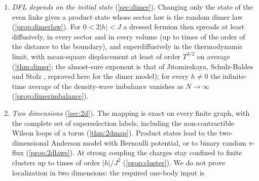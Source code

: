 \begin{enumerate}[label=(\arabic*),leftmargin=2em]
\begin{enumerate}[label=(\alph*)]
sectors equally; no operator-norm version exists, because the clean sector $q\equiv1$, i.e.\ the strictly
gauge-invariant subspace without background charges, is ballistic (\cref{prop:LR}, \cref{rem:gaussproj});
\item the infinite-time imbalance of an initial density wave is strictly positive (\cref{thm:imbalance});
\item the entanglement conditional on the charges, $\SG$, and, on average over the charges, the full
matter-plus-gauge entanglement of definite-charge initial states obey area laws (\cref{thm:arealaw}).  We determine the relations between the
entropies (\cref{prop:entropies}): the number entropy $\SN$ is a lower bound for $\Sfull$, $\Smix$ and the
bare-matter entropy, but not for $\SG$ (\cref{rem:main-SGSN});
\item the number entropy is bounded, with an explicit constant (\cref{thm:numberentropy});
\item thermodynamic limits exist on two-sided chains, with the corresponding bounds for bulk observables (the
imbalance excepted); this part uses only the Ge--Zhao bound on $\Z$ (\cref{thm:infvol}).
\end{enumerate}
The constants are explicit in terms of the decay profile of \cref{thm:EC}.
\item \emph{DFL depends on the initial state} (\cref{sec:dimer}).  Changing only the state of the even links gives a
product state whose sector law is the random dimer law (\cref{prop:dimerlaw}).  For $0<2|h|<J$ a dressed fermion
then spreads at least diffusively, in every sector and in every volume (up to times of the order of the distance to
the boundary), and superdiffusively in the thermodynamic limit, with mean-square displacement at least of order
$T^{3/2}$ on average (\cref{thm:dimer}; the almost-sure exponent is that of Jitomirskaya, Schulz-Baldes and Stolz
\cite{JSBS2003}, reproved here for the dimer model); for every $h\neq0$ the infinite-time average of the
density-wave imbalance vanishes as $N\to\infty$ (\cref{prop:dimerimbalance}).
\item \emph{Two dimensions} (\cref{sec:2d}).  The mapping is exact on every finite graph, with the complete set of
superselection labels, including the non-contractible Wilson loops of a torus (\cref{thm:2dmap}).  Product states
lead to the two-dimensional Anderson model with Bernoulli potential, or to binary random $\pi$-flux
(\cref{prop:2dlaws}).  At strong coupling the charges stay confined to finite clusters up to times of order
$|h|/J^2$ (\cref{prop:cluster}).  We do not prove localization in two dimensions: the required one-body input is

\end{enumerate}
